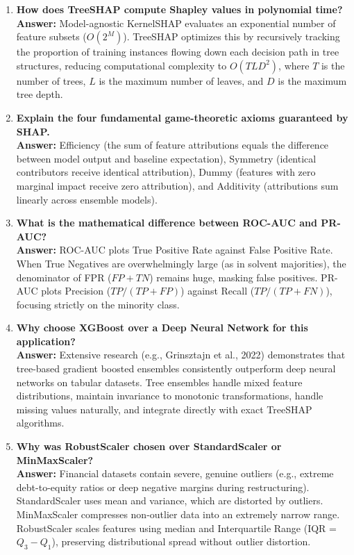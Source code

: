 \documentclass[11pt, a4paper]{article}
\begin{document}
\begin{enumerate}
    \item \textbf{How does TreeSHAP compute Shapley values in polynomial time?}\\
    \textbf{Answer:} Model-agnostic KernelSHAP evaluates an exponential number of feature subsets ($O(2^M)$). TreeSHAP optimizes this by recursively tracking the proportion of training instances flowing down each decision path in tree structures, reducing computational complexity to $O(TLD^2)$, where $T$ is the number of trees, $L$ is the maximum number of leaves, and $D$ is the maximum tree depth.
    
    \item \textbf{Explain the four fundamental game-theoretic axioms guaranteed by SHAP.}\\
    \textbf{Answer:} Efficiency (the sum of feature attributions equals the difference between model output and baseline expectation), Symmetry (identical contributors receive identical attribution), Dummy (features with zero marginal impact receive zero attribution), and Additivity (attributions sum linearly across ensemble models).
    
    \item \textbf{What is the mathematical difference between ROC-AUC and PR-AUC?}\\
    \textbf{Answer:} ROC-AUC plots True Positive Rate against False Positive Rate. When True Negatives are overwhelmingly large (as in solvent majorities), the denominator of FPR ($FP + TN$) remains huge, masking false positives. PR-AUC plots Precision ($TP / (TP + FP)$) against Recall ($TP / (TP + FN)$), focusing strictly on the minority class.
    
    \item \textbf{Why choose XGBoost over a Deep Neural Network for this application?}\\
    \textbf{Answer:} Extensive research (e.g., Grinsztajn et al., 2022) demonstrates that tree-based gradient boosted ensembles consistently outperform deep neural networks on tabular datasets. Tree ensembles handle mixed feature distributions, maintain invariance to monotonic transformations, handle missing values naturally, and integrate directly with exact TreeSHAP algorithms.
    
    \item \textbf{Why was RobustScaler chosen over StandardScaler or MinMaxScaler?}\\
    \textbf{Answer:} Financial datasets contain severe, genuine outliers (e.g., extreme debt-to-equity ratios or deep negative margins during restructuring). StandardScaler uses mean and variance, which are distorted by outliers. MinMaxScaler compresses non-outlier data into an extremely narrow range. RobustScaler scales features using median and Interquartile Range (IQR = $Q_3 - Q_1$), preserving distributional spread without outlier distortion.
    

\end{enumerate}
\end{document}

